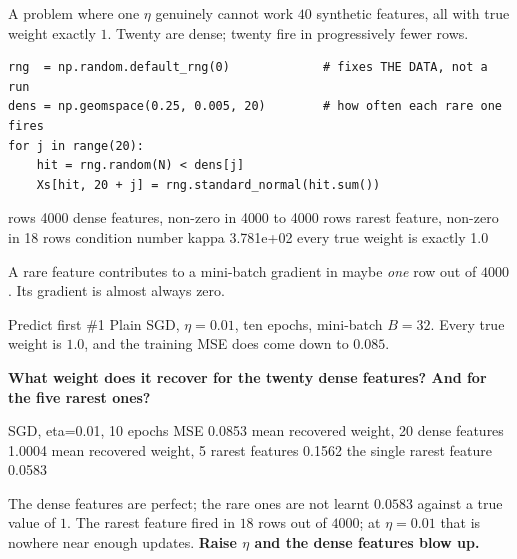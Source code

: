 \documentclass[aspectratio=169]{beamer}
\begin{document}
\begin{frame}[fragile,shrink=6]{A problem where one $\eta$ genuinely cannot work}
$40$ synthetic features, all with true weight exactly $1$. Twenty are dense;
twenty fire in progressively fewer rows.
\begin{lstlisting}
rng  = np.random.default_rng(0)             # fixes THE DATA, not a run
dens = np.geomspace(0.25, 0.005, 20)        # how often each rare one fires
for j in range(20):
    hit = rng.random(N) < dens[j]
    Xs[hit, 20 + j] = rng.standard_normal(hit.sum())
\end{lstlisting}
\begin{outblk}
rows                       4000
dense features, non-zero in 4000 to 4000 rows
rarest feature, non-zero in 18 rows
condition number  kappa    3.781e+02
every true weight is exactly 1.0
\end{outblk}
\begin{center}\small
  A rare feature contributes to a mini-batch gradient in maybe \emph{one} row
  out of $4000$. Its gradient is almost always zero.
\end{center}
\end{frame}

\begin{frame}[fragile]{Predict first \#1}
Plain SGD, $\eta = 0.01$, ten epochs, mini-batch $B=32$. Every true weight is
$1.0$, and the training MSE does come down to $0.085$.

\begin{center}
  \textbf{What weight does it recover for the twenty dense features?
  And for the five rarest ones?}
\end{center}
\vspace{0.3em}
\begin{outblk}
SGD, eta=0.01, 10 epochs   MSE 0.0853
  mean recovered weight, 20 dense features   1.0004
  mean recovered weight, 5 rarest features   0.1562
  the single rarest feature                  0.0583
\end{outblk}
\begin{alertblock}{The dense features are perfect; the rare ones are not learnt}
  \footnotesize $0.0583$ against a true value of $1$. The rarest feature fired
  in $18$ rows out of $4000$; at $\eta = 0.01$ that is nowhere near enough
  updates. \textbf{Raise $\eta$ and the dense features blow up.}
\end{alertblock}
\end{frame}

\end{document}
